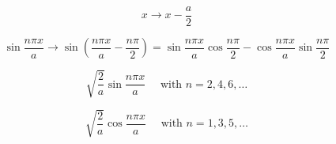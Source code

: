 \documentclass[a4paper,12pt, twoside]{article}
\begin{document}
\begin{equation*}
x \rightarrow x - \frac { a } { 2 }
\end{equation*}


\begin{equation}
\sin \frac { n \pi x } { a } \rightarrow \sin \left( \frac { n \pi x } { a } - \frac { n \pi } { 2 } \right) = \sin \frac { n \pi x } { a } \cos \frac { n \pi } { 2 } - \cos \frac { n \pi x } { a } \sin \frac { n \pi } { 2 }
\end{equation}


\begin{equation}
\sqrt { \frac { 2 } { a } } \sin \frac { n \pi x } { a } \quad \text { with } n = 2,4,6 , \dots
\end{equation}


\begin{equation}
\sqrt { \frac { 2 } { a } } \cos \frac { n \pi x } { a } \quad \text { with } n = 1,3,5 , \dots
\end{equation}

\newpage
\renewcommand\refname{Kaynaklar}
{}
 
\end{document}
